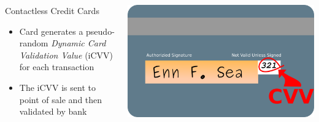 \documentclass[unknownkeysallowed]{beamer}
\begin{document}
\begin{frame}
  \vspace{6mm}
  \begin{columns}[c] %
        \begin{block}{Contactless Credit Cards}
            \begin{itemize}
              \item{Card generates a pseudo-random \textit{Dynamic Card Validation Value} (iCVV) for each transaction}
              \item{The iCVV is sent to point of sale and then validated by bank}
            \end{itemize}
          \end{block}
        \includegraphics[width=\linewidth,height=\textheight,keepaspectratio]{figures/cvv.png}
      \end{columns}
\end{frame}
\end{document}
